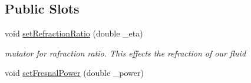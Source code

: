 \subsection*{Public Slots}
\begin{DoxyCompactItemize}
\item 
\hypertarget{class_open_g_l_widget_af84cea3a80d4880fe6cf3e10f469bbdb}{void \hyperlink{class_open_g_l_widget_af84cea3a80d4880fe6cf3e10f469bbdb}{set\-Refraction\-Ratio} (double \-\_\-eta)}\label{class_open_g_l_widget_af84cea3a80d4880fe6cf3e10f469bbdb}

\begin{DoxyCompactList}\small\item\em mutator for rafraction ratio. This effects the refraction of our fluid \end{DoxyCompactList}\item 
\hypertarget{class_open_g_l_widget_a6422eaacd015444b7813a1ce683bea19}{void \hyperlink{class_open_g_l_widget_a6422eaacd015444b7813a1ce683bea19}{set\-Fresnal\-Power} (double \-\_\-power)}\label{class_open_g_l_widget_a6422eaacd015444b7813a1ce683bea19}


\end{DoxyCompactItemize}
